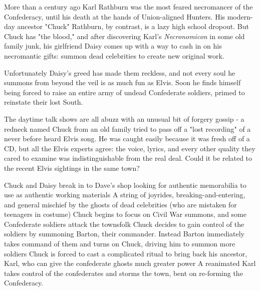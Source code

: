 \documentclass{motw}
\begin{document}




More than a century ago Karl Rathburn was the most feared necromancer of the Confederacy, until his death at the hands of Union-aligned Hunters.  His modern-day ancestor "Chuck" Rathburn, by contrast, is a lazy high school dropout. But Chuck has "the blood," and after discovering  Karl's \emph{Necronomicon} in some old family junk, his girlfriend Daisy comes up with a way to cash in on his necromantic gifts: summon dead celebrities to create new original work.

Unfortunately Daisy's greed has made them reckless, and not every soul he summons from beyond the veil is as much fun as Elvis.  Soon he finds himself being forced to raise an entire army of undead Confederate soldiers, primed to reinstate their lost South.


The daytime talk shows are all abuzz with an unusual bit of forgery gossip - a redneck named Chuck from an old family tried to pass off a "lost recording" of a never before heard Elvis song.  He was caught easily because it was fresh off of a CD, but all the Elvis experts agree: the voice, lyrics, and every other quality they cared to examine was indistinguishable from the real deal.  Could it be related to the recent Elvis sightings in the same town?

\Countdown%
{Chuck and Daisy break in to Dave's shop looking for authentic memorabilia to use as authentic working materials}%
{A string of joyrides, breaking-and-entering, and general mischief by the ghosts of dead celebrities (who are mistaken for teenagers in costume)}%
{Chuck begins to focus on Civil War summons, and some Confederate soldiers attack the townsfolk}%
{Chuck decides to gain control of the soldiers by summoning Barton, their commander.  Instead Barton immediately takes command of them and turns on Chuck, driving him to summon more soldiers}%
{Chuck is forced to cast a complicated ritual to bring back his ancestor, Karl, who can give the confederate ghosts much greater power}%
{A reanimated Karl takes control of the confederates and storms the town, bent on re-forming the Confederacy.}%
\end{document}
